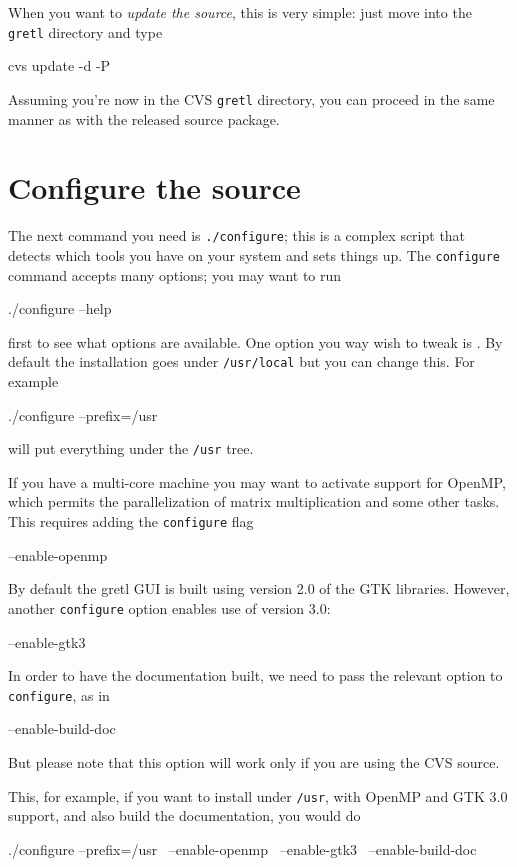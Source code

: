 When you want to \textit{update the source}, this is very simple: just move into
the \texttt{gretl} directory and type
\begin{code}
cvs update -d -P
\end{code}

Assuming you're now in the CVS \texttt{gretl} directory, you can
proceed in the same manner as with the released source package.


\section{Configure the source}
          
The next command you need is \texttt{./configure}; this is a complex
script that detects which tools you have on your system and sets
things up. The \texttt{configure} command accepts many
options; you may want to run 
\begin{code}
./configure --help
\end{code}
first to see what options are available. One option you way wish to
tweak is .  By default the installation goes under
\verb+/usr/local+ but you can change this.  For example
\begin{code}
./configure --prefix=/usr
\end{code}
will put everything under the \verb+/usr+ tree.  

If you have a multi-core machine you may want to activate support
for OpenMP, which permits the parallelization of matrix
multiplication and some other tasks. This requires adding the
\texttt{configure} flag
\begin{code}
--enable-openmp
\end{code}

By default the gretl GUI is built using version 2.0 of the 
GTK libraries. However, another \texttt{configure} option enables
use of version 3.0:
\begin{code}
--enable-gtk3
\end{code}

In order to have the documentation built, we need to pass the relevant
option to \texttt{configure}, as in
\begin{code}
--enable-build-doc
\end{code}
But please note that this option will work only if you are using
the CVS source.

This, for example, if you want to install under \texttt{/usr},
with OpenMP and GTK 3.0 support, and also build the documentation, you
would do
\begin{code}
./configure --prefix=/usr \
 --enable-openmp \
 --enable-gtk3 \
 --enable-build-doc
\end{code}

